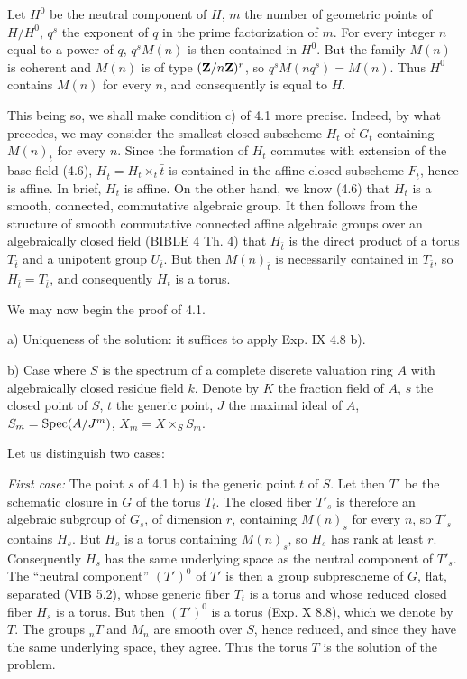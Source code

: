 Let $H^0$ be the neutral component of $H$, $m$ the number of geometric points of $H/H^0$, $q^s$ the exponent of $q$ in the prime factorization of $m$. For every integer $n$ equal to a power of $q$, $q^sM(n)$ is then contained in $H^0$. But the family $M(n)$ is coherent and $M(n)$ is of type $(\mathbf{Z}/n\mathbf{Z})^r$, so $q^sM(nq^s)=M(n)$. Thus $H^0$ contains $M(n)$ for every $n$, and consequently is equal to $H$.

This being so, we shall make condition c) of 4.1 more precise. Indeed, by what precedes, we may consider the smallest closed subscheme $H_t$ of $G_t$ containing $M(n)_t$ for every $n$. Since the formation of $H_t$ commutes with extension of the base field (4.6), $H_{\bar t}=H_t\times_t\bar t$ is contained in the affine closed subscheme $F_{\bar t}$, hence is affine. In brief, $H_t$ is affine. On the other hand, we know (4.6) that $H_t$ is a smooth, connected, commutative algebraic group. It then follows from the structure of smooth commutative connected affine algebraic groups over an algebraically closed field (BIBLE 4 Th. 4) that $H_{\bar t}$ is the direct product of a torus $T_{\bar t}$ and a unipotent group $U_{\bar t}$. But then $M(n)_{\bar t}$ is necessarily contained in $T_{\bar t}$, so $H_{\bar t}=T_{\bar t}$, and consequently $H_t$ is a torus.

We may now begin the proof of 4.1.

\noindent a) Uniqueness of the solution: it suffices to apply Exp. IX 4.8 b).

\noindent b) Case where $S$ is the spectrum of a complete discrete valuation ring $A$ with algebraically closed residue field $k$. Denote by $K$ the fraction field of $A$, $s$ the closed point of $S$, $t$ the generic point, $J$ the maximal ideal of $A$, $S_m=\operatorname{Spec}(A/J^m)$, $X_m=X\times_S S_m$.

Let us distinguish two cases:

\noindent\emph{First case:} The point $s$ of 4.1 b) is the generic point $t$ of $S$. Let then $T'$ be the schematic closure in $G$ of the torus $T_t$. The closed fiber $T'_s$ is therefore an algebraic subgroup of $G_s$, of dimension $r$, containing $M(n)_s$ for every $n$, so $T'_s$ contains $H_s$. But $H_s$ is a torus containing $M(n)_s$, so $H_s$ has rank at least $r$. Consequently $H_s$ has the same underlying space as the neutral component of $T'_s$. The ``neutral component'' $(T')^0$ of $T'$ is then a group subprescheme of $G$, flat, separated (VIB 5.2), whose generic fiber $T_t$ is a torus and whose reduced closed fiber $H_s$ is a torus. But then $(T')^0$ is a torus (Exp. X 8.8), which we denote by $T$. The groups ${}_nT$ and $M_n$ are smooth over $S$, hence reduced, and since they have the same underlying space, they agree. Thus the torus $T$ is the solution of the problem.

